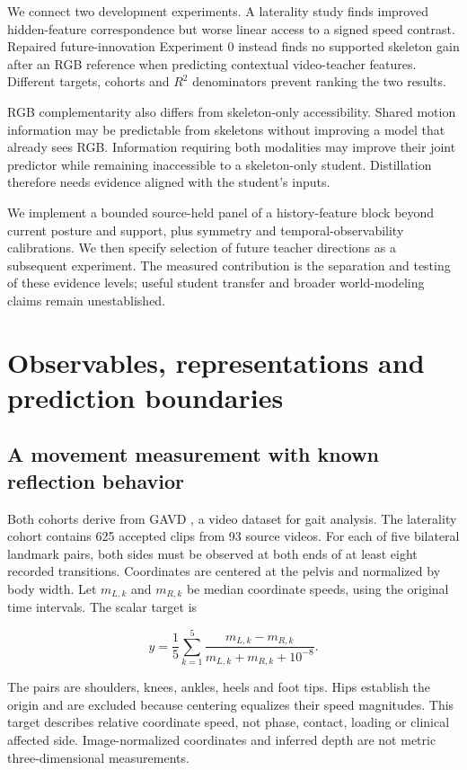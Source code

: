 \documentclass{article}
\begin{document}
We connect two development experiments. A laterality study finds improved hidden-feature correspondence but worse linear access to a signed speed contrast. Repaired future-innovation Experiment 0 instead finds no supported skeleton gain after an RGB reference when predicting contextual video-teacher features. Different targets, cohorts and \(R^2\) denominators prevent ranking the two results.

RGB complementarity also differs from skeleton-only accessibility. Shared motion information may be predictable from skeletons without improving a model that already sees RGB. Information requiring both modalities may improve their joint predictor while remaining inaccessible to a skeleton-only student. Distillation therefore needs evidence aligned with the student's inputs.

We implement a bounded source-held panel of a history-feature block beyond current posture and support, plus symmetry and temporal-observability calibrations. We then specify selection of future teacher directions as a subsequent experiment. The measured contribution is the separation and testing of these evidence levels; useful student transfer and broader world-modeling claims remain unestablished.

\section{Observables, representations and prediction boundaries}\label{observables-representations-and-prediction-boundaries}

\subsection{A movement measurement with known reflection behavior}\label{a-movement-measurement-with-known-reflection-behavior}

Both cohorts derive from GAVD \citep{ranjan2024gavd}, a video dataset for gait analysis. The laterality cohort contains 625 accepted clips from 93 source videos. For each of five bilateral landmark pairs, both sides must be observed at both ends of at least eight recorded transitions. Coordinates are centered at the pelvis and normalized by body width. Let \(m_{L,k}\) and \(m_{R,k}\) be median coordinate speeds, using the original time intervals. The scalar target is

\[
y=\frac{1}{5}\sum_{k=1}^{5}
\frac{m_{L,k}-m_{R,k}}{m_{L,k}+m_{R,k}+10^{-8}}.
\]

The pairs are shoulders, knees, ankles, heels and foot tips. Hips establish the origin and are excluded because centering equalizes their speed magnitudes. This target describes relative coordinate speed, not phase, contact, loading or clinical affected side. Image-normalized coordinates and inferred depth are not metric three-dimensional measurements.
\end{document}
